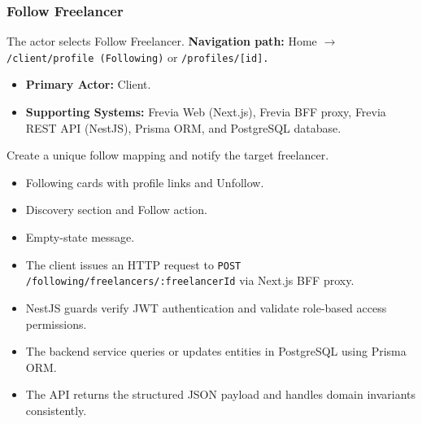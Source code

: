 \subsubsection{Follow Freelancer}

The actor selects Follow Freelancer.\newline
\textbf{Navigation path:} Home $\rightarrow$ \texttt{/\allowbreak{}client/\allowbreak{}profile (Following)} or \texttt{/\allowbreak{}profiles/\allowbreak{}[id].}


\begin{itemize}[leftmargin=1.6em,topsep=3pt,itemsep=2pt,parsep=0pt,label=$\bullet$]
    \item \textbf{Primary Actor:} Client.
    \item \textbf{Supporting Systems:} Frevia Web (Next.js), Frevia BFF proxy, Frevia REST API (NestJS), Prisma ORM, and PostgreSQL database.
\end{itemize}

\noindent Create a unique follow mapping and notify the target freelancer.

\begin{itemize}[leftmargin=1.6em,topsep=3pt,itemsep=2pt,parsep=0pt,label=$\bullet$]
    \item Following cards with profile links and Unfollow.
    \item Discovery section and Follow action.
    \item Empty-state message.
\end{itemize}

\begin{itemize}[leftmargin=1.6em,topsep=3pt,itemsep=2pt,parsep=0pt,label=$\bullet$]
    \item The client issues an HTTP request to \texttt{POST /\allowbreak{}following/\allowbreak{}freelancers/\allowbreak{}:\allowbreak{}freelancerId} via Next.js BFF proxy.
    \item NestJS guards verify JWT authentication and validate role-based access permissions.
    \item The backend service queries or updates entities in PostgreSQL using Prisma ORM.
    \item The API returns the structured JSON payload and handles domain invariants consistently.
\end{itemize}

